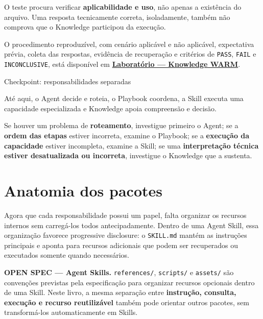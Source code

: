 \documentclass[
  10pt,
  a4paper,
  oneside]{book}
\begin{document}
O teste procura verificar \textbf{aplicabilidade e uso}, não apenas a
existência do arquivo. Uma resposta tecnicamente correta, isoladamente,
também não comprova que o Knowledge participou da execução.

O procedimento reproduzível, com cenário aplicável e não aplicável,
expectativa prévia, coleta das respostas, evidência de recuperação e
critérios de \texttt{PASS}, \texttt{FAIL} e \texttt{INCONCLUSIVE}, está
disponível em
\textbf{\protect\hyperlink{laboratorio-knowledge-warm}{Laboratório ---
Knowledge WARM}}.

\begin{infobox}{Checkpoint: responsabilidades separadas}

Até aqui, o Agent decide e roteia, o Playbook coordena, a Skill executa
uma capacidade especializada e Knowledge apoia compreensão e decisão.

Se houver um problema de \textbf{roteamento}, investigue primeiro o
Agent; se a \textbf{ordem das etapas} estiver incorreta, examine o
Playbook; se a \textbf{execução da capacidade} estiver incompleta,
examine a Skill; se uma \textbf{interpretação técnica estiver
desatualizada ou incorreta}, investigue o Knowledge que a sustenta.

\end{infobox}

\hypertarget{anatomia-dos-pacotes}{%
\section{Anatomia dos pacotes}\label{anatomia-dos-pacotes}}

Agora que cada responsabilidade possui um papel, falta organizar os
recursos internos sem carregá-los todos antecipadamente. Dentro de uma
Agent Skill, essa organização favorece progressive disclosure: o
\texttt{SKILL.md} mantém as instruções principais e aponta para recursos
adicionais que podem ser recuperados ou executados somente quando
necessários.

\textbf{OPEN SPEC --- Agent Skills.} \texttt{references/},
\texttt{scripts/} e \texttt{assets/} são convenções previstas pela
especificação para organizar recursos opcionais dentro de uma Skill.
Neste livro, a mesma separação entre \textbf{instrução, consulta,
execução e recurso reutilizável} também pode orientar outros pacotes,
sem transformá-los automaticamente em Skills.
\end{document}
